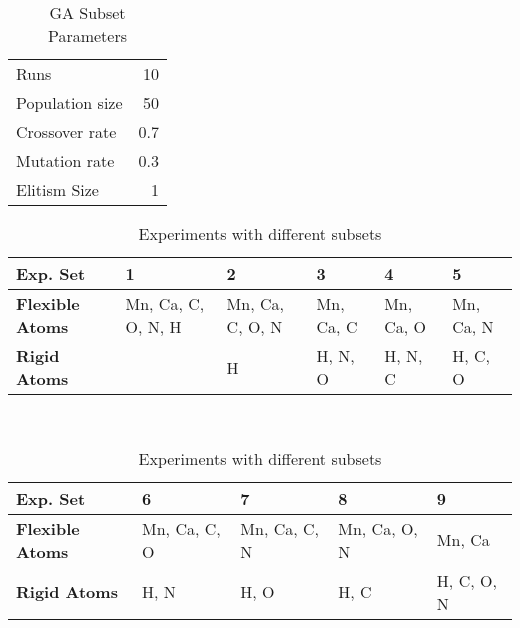 \begin{table}
	\centering
	\begin{tabular}{ l r }
		\hline
		Runs & 10 \\
		Population size & 50 \\
		Crossover rate & 0.7 \\
		Mutation rate & 0.3 \\
		Elitism Size & 1 \\
		\hline
	\end{tabular}
	\caption{GA Subset Parameters}
	\label{table:subset-parameters}
\end{table}

\begin{table}
	\centering
	\begin{tabular}{ | >{\bfseries}p{2cm} | p{1cm} | p{1cm} | p{1cm} | p{1cm} | p{1cm} | }
		\hline
		Exp. Set & 1 & 2 & 3 & 4 & 5 \\ \hline
		Flexible Atoms & Mn, Ca, C, O, N, H & Mn, Ca, C, O, N & Mn, Ca, C & Mn, Ca, O & Mn, Ca, N \\ \hline
		Rigid Atoms &  & H & H, N, O & H, N, C & H, C, O \\ \hline
	\end{tabular}
	\\
	\vspace{3 mm}
	\begin{tabular}{ | >{\bfseries}p{2cm} | p{1cm} | p{1cm} | p{1cm} | p{1cm} | }
		\hline
		Exp. Set & 6 & 7 & 8 & 9 \\ \hline
		Flexible Atoms & Mn, Ca, C, O & Mn, Ca, C, N & Mn, Ca, O, N & Mn, Ca \\ \hline
		Rigid Atoms & H, N & H, O & H, C & H, C, O, N \\ \hline
	\end{tabular}
	\caption{Experiments with different subsets}
	\label{table:subset-setup}
\end{table}